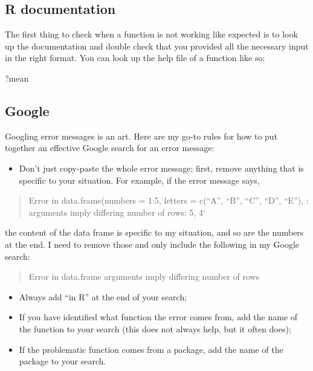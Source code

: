 \documentclass[
]{book}
\newenvironment{Shaded}{\begin{snugshade}}{\end{snugshade}}
\newcommand{\NormalTok}[1]{#1}
\providecommand{\tightlist}{%
  \setlength{\itemsep}{0pt}\setlength{\parskip}{0pt}}
\begin{document}
\hypertarget{r-documentation}{%
\subsection{R documentation}\label{r-documentation}}

The first thing to check when a function is not working like expected is to
look up the documentation and double check that you provided all the necessary
input in the right format. You can look up the help file of a function like so:

\begin{Shaded}
\begin{Highlighting}[]
\NormalTok{?mean}
\end{Highlighting}
\end{Shaded}

\hypertarget{google}{%
\subsection{Google}\label{google}}

Googling error messages is an art. Here are my go-to rules for how to put
together an effective Google search for an error message:

\begin{itemize}
\tightlist
\item
  Don't just copy-paste the whole error message; first, remove anything that is
  specific to your situation. For example, if the error message says,
\end{itemize}

\begin{quote}
Error in data.frame(numbers = 1:5, letters = c(``A'', ``B'', ``C'', ``D'', ``E''), :
arguments imply differing number of rows: 5, 4`
\end{quote}

the content of the data frame is specific to my situation, and so are the
numbers at the end. I need to remove those and only include the following in
my Google search:

\begin{quote}
Error in data.frame arguments imply differing number of rows
\end{quote}

\begin{itemize}
\tightlist
\item
  Always add ``in R'' at the end of your search;
\item
  If you have identified what function the error comes from, add the name of the
  function to your search (this does not always help, but it often does);
\item
  If the problematic function comes from a package, add the name of the package
  to your search.
\end{itemize}
\end{document}
